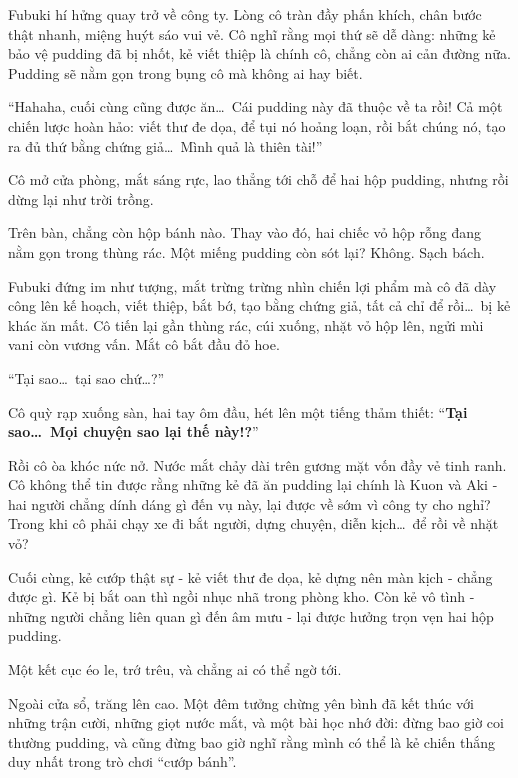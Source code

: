 \documentclass[../main.tex]{subfiles}
\begin{document}
\ct

Fubuki hí hửng quay trở về công ty. Lòng cô tràn đầy phấn khích, chân bước thật nhanh, miệng huýt sáo vui vẻ. Cô nghĩ rằng mọi thứ sẽ dễ dàng: những kẻ bảo vệ pudding đã bị nhốt, kẻ viết thiệp là chính cô, chẳng còn ai cản đường nữa. Pudding sẽ nằm gọn trong bụng cô mà không ai hay biết.

``Hahaha, cuối cùng cũng được ăn\dots\ Cái pudding này đã thuộc về ta rồi! Cả một chiến lược hoàn hảo: viết thư đe dọa, để tụi nó hoảng loạn, rồi bắt chúng nó, tạo ra đủ thứ bằng chứng giả\dots\ Mình quả là thiên tài!''

Cô mở cửa phòng, mắt sáng rực, lao thẳng tới chỗ để hai hộp pudding, nhưng rồi dừng lại như trời trồng.

Trên bàn, chẳng còn hộp bánh nào. Thay vào đó, hai chiếc vỏ hộp rỗng đang nằm gọn trong thùng rác. Một miếng pudding còn sót lại? Không. Sạch bách.

Fubuki đứng im như tượng, mắt trừng trừng nhìn chiến lợi phẩm mà cô đã dày công lên kế hoạch, viết thiệp, bắt bớ, tạo bằng chứng giả,  tất cả chỉ để rồi\dots\ bị kẻ khác ăn mất. Cô tiến lại gần thùng rác, cúi xuống, nhặt vỏ hộp lên, ngửi mùi vani còn vương vấn. Mắt cô bắt đầu đỏ hoe.

``Tại sao\dots\ tại sao chứ\dots?''

Cô quỳ rạp xuống sàn, hai tay ôm đầu, hét lên một tiếng thảm thiết: ``\textbf{Tại sao\dots\ Mọi chuyện sao lại thế này!?}''

Rồi cô òa khóc nức nở. Nước mắt chảy dài trên gương mặt vốn đầy vẻ tinh ranh. Cô không thể tin được rằng những kẻ đã ăn pudding lại chính là Kuon và Aki - hai người chẳng dính dáng gì đến vụ này, lại được về sớm vì công ty cho nghỉ? Trong khi cô phải chạy xe đi bắt người, dựng chuyện, diễn kịch\dots\ để rồi về nhặt vỏ?

Cuối cùng, kẻ cướp thật sự - kẻ viết thư đe dọa, kẻ dựng nên màn kịch - chẳng được gì. Kẻ bị bắt oan thì ngồi nhục nhã trong phòng kho. Còn kẻ vô tình - những người chẳng liên quan gì đến âm mưu - lại được hưởng trọn vẹn hai hộp pudding.

Một kết cục éo le, trớ trêu, và chẳng ai có thể ngờ tới.

Ngoài cửa sổ, trăng lên cao. Một đêm tưởng chừng yên bình đã kết thúc với những trận cười, những giọt nước mắt, và một bài học nhớ đời: đừng bao giờ coi thường pudding, và cũng đừng bao giờ nghĩ rằng mình có thể là kẻ chiến thắng duy nhất trong trò chơi ``cướp bánh''.
\end{document}
